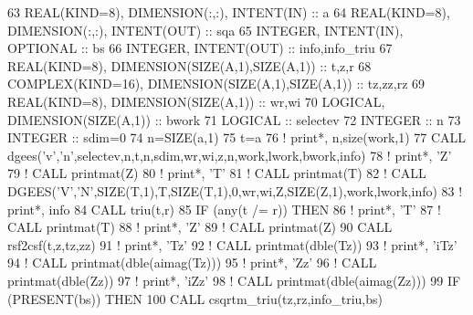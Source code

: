 \begin{DoxyCode}
63     \textcolor{keywordtype}{REAL(KIND=8)}, \textcolor{keywordtype}{DIMENSION(:,:)}, \textcolor{keywordtype}{INTENT(IN)} :: a
64     \textcolor{keywordtype}{REAL(KIND=8)}, \textcolor{keywordtype}{DIMENSION(:,:)}, \textcolor{keywordtype}{INTENT(OUT)} :: sqa
65     \textcolor{keywordtype}{INTEGER}, \textcolor{keywordtype}{INTENT(IN)}, \textcolor{keywordtype}{OPTIONAL} :: bs
66     \textcolor{keywordtype}{INTEGER}, \textcolor{keywordtype}{INTENT(OUT)} :: info,info\_triu
67     \textcolor{keywordtype}{REAL(KIND=8)}, \textcolor{keywordtype}{DIMENSION(SIZE(A,1),SIZE(A,1))} :: t,z,r
68     \textcolor{keywordtype}{COMPLEX(KIND=16)}, \textcolor{keywordtype}{DIMENSION(SIZE(A,1),SIZE(A,1))} :: tz,zz,rz
69     \textcolor{keywordtype}{REAL(KIND=8)}, \textcolor{keywordtype}{DIMENSION(SIZE(A,1))} :: wr,wi
70     \textcolor{keywordtype}{LOGICAL}, \textcolor{keywordtype}{DIMENSION(SIZE(A,1))} :: bwork
71     \textcolor{keywordtype}{LOGICAL} :: selectev
72     \textcolor{keywordtype}{INTEGER} :: n
73     \textcolor{keywordtype}{INTEGER} :: sdim=0
74     n=\textcolor{keyword}{SIZE}(a,1)
75     t=a
76     \textcolor{comment}{! print*, n,size(work,1)}
77     \textcolor{keyword}{CALL }dgees(\textcolor{stringliteral}{'v'},\textcolor{stringliteral}{'n'},selectev,n,t,n,sdim,wr,wi,z,n,work,lwork,bwork,info)
78     \textcolor{comment}{! print*, 'Z'}
79     \textcolor{comment}{! CALL printmat(Z)}
80     \textcolor{comment}{! print*, 'T'}
81     \textcolor{comment}{! CALL printmat(T)}
82     \textcolor{comment}{! CALL DGEES('V','N',SIZE(T,1),T,SIZE(T,1),0,wr,wi,Z,SIZE(Z,1),work,lwork,info)}
83     \textcolor{comment}{! print*, info}
84     \textcolor{keyword}{CALL }triu(t,r)
85     \textcolor{keywordflow}{IF} (any(t /= r)) \textcolor{keywordflow}{THEN}
86        \textcolor{comment}{! print*, 'T'}
87        \textcolor{comment}{! CALL printmat(T)}
88        \textcolor{comment}{! print*, 'Z'}
89        \textcolor{comment}{! CALL printmat(Z)}
90        \textcolor{keyword}{CALL }rsf2csf(t,z,tz,zz)
91        \textcolor{comment}{! print*, 'Tz'}
92        \textcolor{comment}{! CALL printmat(dble(Tz))}
93        \textcolor{comment}{! print*, 'iTz'}
94        \textcolor{comment}{! CALL printmat(dble(aimag(Tz)))}
95        \textcolor{comment}{! print*, 'Zz'}
96        \textcolor{comment}{! CALL printmat(dble(Zz))}
97        \textcolor{comment}{! print*, 'iZz'}
98        \textcolor{comment}{! CALL printmat(dble(aimag(Zz)))}
99        \textcolor{keywordflow}{IF} (\textcolor{keyword}{PRESENT}(bs)) \textcolor{keywordflow}{THEN}
100           \textcolor{keyword}{CALL }csqrtm\_triu(tz,rz,info\_triu,bs)

\end{DoxyCode}
